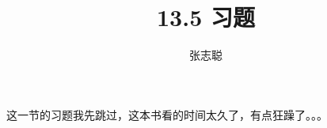 \documentclass{article}
\begin{document}
\title{13.5 习题}
\author{张志聪}
\maketitle

这一节的习题我先跳过，这本书看的时间太久了，有点狂躁了。。。







\end{document}
